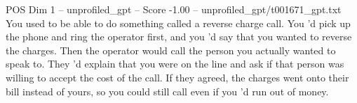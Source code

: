 \begin{textsample}{POS Dim 1 – unprofiled\_gpt – Score -1.00 – unprofiled\_gpt/t001671\_gpt.txt}  \label{ex:f1_pos_024}
You used to be able to do something called a reverse charge call.
You ’d pick up the phone and ring the operator first, and you ’d say that you wanted to reverse the charges.
Then the operator would call the person you actually wanted to speak to.
They ’d explain that you were on the line and ask if that person was willing to accept the cost of the call.
If they agreed, the charges went onto their bill instead of yours, so you could still call even if you ’d run out of money.

\end{textsample}
